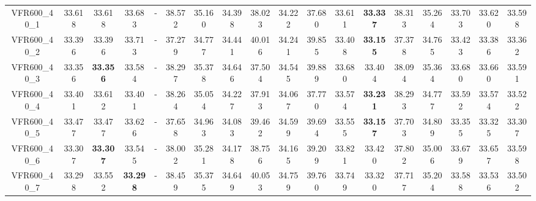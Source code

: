 \begin{tabular}{cc|ccc|ccccccccccccc}
VFR600\_40\_1      & 33.618           & 33.618           & 33.683           & -                & 38.572           & 35.160           & 34.398           & 38.023           & 34.222           & 37.680           & 33.611           & {\bf 33.337}     & 38.313           & 35.264           & 33.703           & 33.620           & 33.598          \\ 
VFR600\_40\_2      & 33.396           & 33.396           & 33.713           & -                & 37.279           & 34.777           & 34.441           & 40.016           & 34.241           & 39.855           & 33.408           & {\bf 33.155}     & 37.378           & 34.765           & 33.423           & 33.386           & 33.362          \\ 
VFR600\_40\_3      & 33.356           & {\bf 33.356}     & 33.584           & -                & 38.297           & 35.378           & 34.646           & 37.504           & 34.545           & 39.889           & 33.680           & 33.404           & 38.094           & 35.364           & 33.680           & 33.660           & 33.591          \\ 
VFR600\_40\_4      & 33.401           & 33.612           & 33.401           & -                & 38.264           & 35.054           & 34.227           & 37.913           & 34.067           & 37.770           & 33.574           & {\bf 33.231}     & 38.293           & 34.777           & 33.592           & 33.574           & 33.522          \\ 
VFR600\_40\_5      & 33.477           & 33.477           & 33.626           & -                & 37.658           & 34.963           & 34.083           & 39.462           & 34.599           & 39.694           & 33.555           & {\bf 33.157}     & 37.703           & 34.809           & 33.355           & 33.325           & 33.307          \\ 
VFR600\_40\_6      & 33.307           & {\bf 33.307}     & 33.545           & -                & 38.002           & 35.281           & 34.178           & 38.756           & 34.165           & 39.209           & 33.821           & 33.420           & 37.802           & 35.006           & 33.679           & 33.657           & 33.598          \\ 
VFR600\_40\_7      & 33.298           & 33.552           & {\bf 33.298}     & -                & 38.459           & 35.375           & 34.649           & 40.053           & 34.759           & 39.760           & 33.749           & 33.320           & 37.717           & 35.204           & 33.588           & 33.536           & 33.502          \\ 

\end{tabular}
